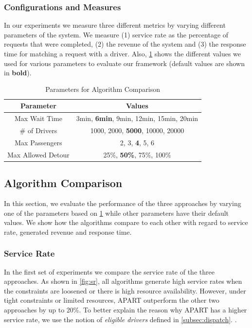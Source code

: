 \subsubsection{Configurations and Measures}
In our experiments we measure three different metrics by varying different parameters of the system. We measure (1) service rate as the percentage of requests that were completed, (2) the revenue of the system and (3) the response time for matching a request with a driver. Also, \cref{tab:params} shows the different values we used for various parameters to evaluate our framework (default values are shown in \textbf{bold}).


\begin{table}
\begin{center}
\begin{tabular}{|c|c|}
	\hline
	Parameter & Values \\
	\hline \hline
	Max Wait Time & 3min, \textbf{6min}, 9min, 12min, 15min, 20min \\ 
	\hline
	\# of Drivers & 1000, 2000, \textbf{5000},  10000, 20000\\ 
	\hline
	Max Passengers & 2, 3, \textbf{4}, 5, 6 \\
	\hline
	Max Allowed Detour & 25\%, \textbf{50\%}, 75\%, 100\%\\
	\hline
\end{tabular}
\caption{Parameters for Algorithm Comparison}
\label{tab:params}
\end{center}
\end{table}

\subsection{Algorithm Comparison}
In this section, we evaluate the performance of the three approaches by varying one of the parameters based on \cref{tab:params} while other parameters have their default values. We show how the algorithms compare to each other with regard to service rate, generated revenue and response time.

\subsubsection{Service Rate}
In the first set of experiments we compare the service rate of the three approaches. As shown in \cref{fig:sr}, all algorithms generate high service rates when the constraints are loosened or there is high resource availability. However, under tight constraints or limited resources, APART outperform the other two approaches by up to 20\%. To better explain the reason why APART has a higher service rate, we use the notion of \textit{eligible drivers} defined in \cref{subsec:dispatch}. .

